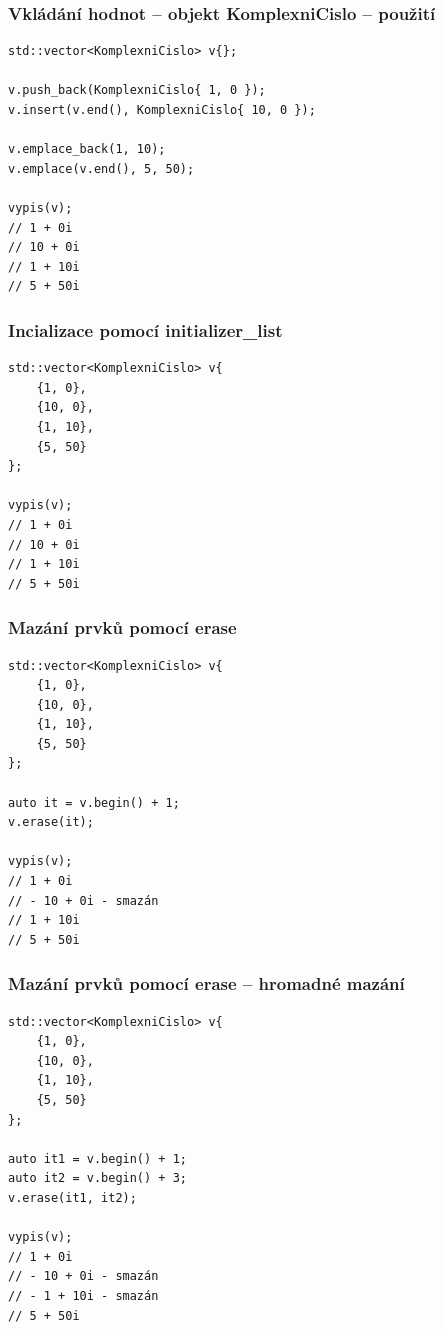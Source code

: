\begin{frame}[fragile]
\frametitle{Vkládání hodnot -- objekt KomplexniCislo -- použití}
\begin{yesblock}
\begin{lstlisting}
std::vector<KomplexniCislo> v{};

v.push_back(KomplexniCislo{ 1, 0 });
v.insert(v.end(), KomplexniCislo{ 10, 0 });

v.emplace_back(1, 10);
v.emplace(v.end(), 5, 50);

vypis(v);
// 1 + 0i
// 10 + 0i
// 1 + 10i
// 5 + 50i
\end{lstlisting}
\end{yesblock}
\end{frame}


\begin{frame}[fragile]
\frametitle{Incializace pomocí initializer\_list}
\begin{yesblock}
\begin{lstlisting}
std::vector<KomplexniCislo> v{
	{1, 0},
	{10, 0},
	{1, 10},
	{5, 50}
};

vypis(v);
// 1 + 0i
// 10 + 0i
// 1 + 10i
// 5 + 50i
\end{lstlisting}
\end{yesblock}
\end{frame}

\begin{frame}[fragile]
\frametitle{Mazání prvků pomocí erase}
\begin{yesblock}
\begin{lstlisting}
std::vector<KomplexniCislo> v{
	{1, 0},
	{10, 0},
	{1, 10},
	{5, 50}
};

auto it = v.begin() + 1;
v.erase(it);

vypis(v);
// 1 + 0i
// - 10 + 0i - smazán
// 1 + 10i
// 5 + 50i
\end{lstlisting}
\end{yesblock}
\end{frame}

\begin{frame}[fragile]
\frametitle{Mazání prvků pomocí erase -- hromadné mazání}
\begin{yesblock}
\begin{lstlisting}
std::vector<KomplexniCislo> v{
	{1, 0},
	{10, 0},
	{1, 10},
	{5, 50}
};

auto it1 = v.begin() + 1;
auto it2 = v.begin() + 3;
v.erase(it1, it2);

vypis(v);
// 1 + 0i
// - 10 + 0i - smazán
// - 1 + 10i - smazán
// 5 + 50i
\end{lstlisting}
\end{yesblock}
\end{frame}




